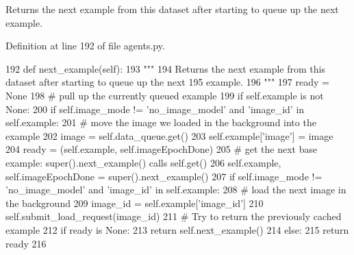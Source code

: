 \begin{DoxyVerb}Returns the next example from this dataset after starting to queue up the next
example.
\end{DoxyVerb}
 

Definition at line 192 of file agents.\+py.


\begin{DoxyCode}
192     \textcolor{keyword}{def }next\_example(self):
193         \textcolor{stringliteral}{"""}
194 \textcolor{stringliteral}{        Returns the next example from this dataset after starting to queue up the next}
195 \textcolor{stringliteral}{        example.}
196 \textcolor{stringliteral}{        """}
197         ready = \textcolor{keywordtype}{None}
198         \textcolor{comment}{# pull up the currently queued example}
199         \textcolor{keywordflow}{if} self.example \textcolor{keywordflow}{is} \textcolor{keywordflow}{not} \textcolor{keywordtype}{None}:
200             \textcolor{keywordflow}{if} self.image\_mode != \textcolor{stringliteral}{'no\_image\_model'} \textcolor{keywordflow}{and} \textcolor{stringliteral}{'image\_id'} \textcolor{keywordflow}{in} self.example:
201                 \textcolor{comment}{# move the image we loaded in the background into the example}
202                 image = self.data\_queue.get()
203                 self.example[\textcolor{stringliteral}{'image'}] = image
204             ready = (self.example, self.imageEpochDone)
205         \textcolor{comment}{# get the next base example: super().next\_example() calls self.get()}
206         self.example, self.imageEpochDone = super().next\_example()
207         \textcolor{keywordflow}{if} self.image\_mode != \textcolor{stringliteral}{'no\_image\_model'} \textcolor{keywordflow}{and} \textcolor{stringliteral}{'image\_id'} \textcolor{keywordflow}{in} self.example:
208             \textcolor{comment}{# load the next image in the background}
209             image\_id = self.example[\textcolor{stringliteral}{'image\_id'}]
210             self.submit\_load\_request(image\_id)
211         \textcolor{comment}{# Try to return the previously cached example}
212         \textcolor{keywordflow}{if} ready \textcolor{keywordflow}{is} \textcolor{keywordtype}{None}:
213             \textcolor{keywordflow}{return} self.next\_example()
214         \textcolor{keywordflow}{else}:
215             \textcolor{keywordflow}{return} ready
216 
\end{DoxyCode}
\mbox{\label{classparlai_1_1tasks_1_1flickr30k_1_1agents_1_1DefaultTeacher_a0711151a8588c499abdda943b27793a8}} 
